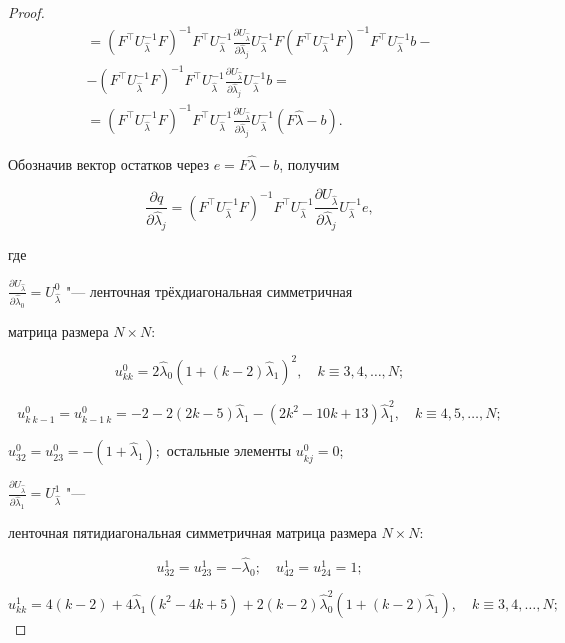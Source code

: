 \begin{proof}
{\begin{multline*}
        =

        ( F^{\top}U^{-1}_{\hat{\lambda}}F ) ^{-1}F^{\top}U^{-1}_{\hat{\lambda}}\frac{\partial U_{\hat{\lambda}}}{\partial\hat{\lambda}_j}U^{-1}_{\hat{\lambda}}F( F^{\top}U^{-1}_{\hat{\lambda}}F ) ^{-1}F^{\top}U^{-1}_{\hat{\lambda}}b-

        \\-

        ( F^{\top}U^{-1}_{\hat{\lambda}}F ) ^{-1}F^{\top}U^{-1}_{\hat{\lambda}}\frac{\partial U_{\hat{\lambda}}}{\partial\hat{\lambda}_j}U^{-1}_{\hat{\lambda}}b= \\

        =

        ( F^{\top}U^{-1}_{\hat{\lambda}}F ) ^{-1}F^{\top}U^{-1}_{\hat{\lambda}}\frac{\partial U_{\hat{\lambda}}}{\partial\hat{\lambda}_j}U^{-1}_{\hat{\lambda}}( F\hat{\lambda}-b ) .

\end{multline*} }



    Обозначив вектор остатков через  $e=F\hat{\lambda}-b$,  получим

$$\frac{\partial q}{\partial\hat{\lambda}_j}=( F^{\top}U^{-1}_{\hat{\lambda}}F ) ^{-1}F^{\top}U^{-1}_{\hat{\lambda}}\frac{\partial U_{\hat{\lambda}}}{\partial\hat{\lambda}_j}U^{-1}_{\hat{\lambda}}e,$$

где 

    $\frac{\partial U_{\hat{\lambda}}}{\partial\hat{\lambda}_0}=U^0_{\hat{\lambda}}$ "---  ленточная трёхдиагональная  симметричная

матрица    размера  $N{\times}N$:

$$u^{0}_{k k}=2\hat{\lambda}_0( 1+( k-2 ) \hat{\lambda}_1 ) ^2, \quad k\equiv 3, 4, \ldots, N;$$

$$u^{0}_{k~k-1}=u^{0}_{k-1~k}=-2-2( 2k-5 ) \hat{\lambda}_1-( 2k^2-10k+13 ) \hat{\lambda}^2_1, \quad k\equiv 4, 5, \ldots, N;$$

$u^{0}_{32}=u^{0}_{23}=-( 1+\hat{\lambda}_1 );$ остальные элементы  $u^{0}_{kj}=0$; 

$\frac{\partial U_{\hat{\lambda}}}{\partial\hat{\lambda}_1}=U^1_{\hat{\lambda}}$ "--- 

ленточная   пятидиагональная   симметричная     матрица    размера  $N{\times} N$:

$$u^{1}_{32}=u^{1}_{23}=-\hat{\lambda}_0;\quad u^{1}_{42}=u^{1}_{24}=1;$$

$$u^{1}_{k k}=4( k-2 ) +4\hat{\lambda}_1( k^2-4k+5 ) +2( k-2 ) \hat{\lambda}^2_0( 1+( k-2 ) \hat{\lambda}_1 ), \quad k\equiv 3, 4, \ldots, N;$$


\end{proof}
